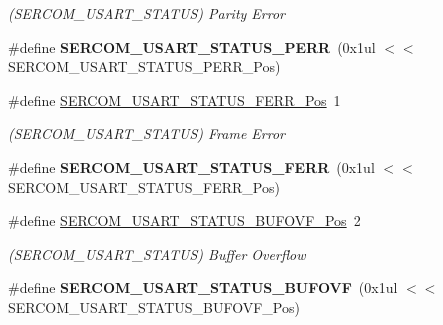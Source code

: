 \begin{DoxyCompactItemize}
\begin{DoxyCompactList}\small\item\em (S\+E\+R\+C\+O\+M\+\_\+\+U\+S\+A\+R\+T\+\_\+\+S\+T\+A\+T\+U\+S) Parity Error \end{DoxyCompactList}\item 
\hypertarget{group___s_a_m_l21___s_e_r_c_o_m_gae5dd4d066087b378990af1ae39991c5c}{}\#define {\bfseries S\+E\+R\+C\+O\+M\+\_\+\+U\+S\+A\+R\+T\+\_\+\+S\+T\+A\+T\+U\+S\+\_\+\+P\+E\+R\+R}~(0x1ul $<$$<$ S\+E\+R\+C\+O\+M\+\_\+\+U\+S\+A\+R\+T\+\_\+\+S\+T\+A\+T\+U\+S\+\_\+\+P\+E\+R\+R\+\_\+\+Pos)\label{group___s_a_m_l21___s_e_r_c_o_m_gae5dd4d066087b378990af1ae39991c5c}

\item 
\hypertarget{group___s_a_m_l21___s_e_r_c_o_m_ga3811cadeeefcecb6228b355ae43a7c43}{}\#define \hyperlink{group___s_a_m_l21___s_e_r_c_o_m_ga3811cadeeefcecb6228b355ae43a7c43}{S\+E\+R\+C\+O\+M\+\_\+\+U\+S\+A\+R\+T\+\_\+\+S\+T\+A\+T\+U\+S\+\_\+\+F\+E\+R\+R\+\_\+\+Pos}~1\label{group___s_a_m_l21___s_e_r_c_o_m_ga3811cadeeefcecb6228b355ae43a7c43}

\begin{DoxyCompactList}\small\item\em (S\+E\+R\+C\+O\+M\+\_\+\+U\+S\+A\+R\+T\+\_\+\+S\+T\+A\+T\+U\+S) Frame Error \end{DoxyCompactList}\item 
\hypertarget{group___s_a_m_l21___s_e_r_c_o_m_ga2e27ff41ea4b7a10bfb9393e0e500581}{}\#define {\bfseries S\+E\+R\+C\+O\+M\+\_\+\+U\+S\+A\+R\+T\+\_\+\+S\+T\+A\+T\+U\+S\+\_\+\+F\+E\+R\+R}~(0x1ul $<$$<$ S\+E\+R\+C\+O\+M\+\_\+\+U\+S\+A\+R\+T\+\_\+\+S\+T\+A\+T\+U\+S\+\_\+\+F\+E\+R\+R\+\_\+\+Pos)\label{group___s_a_m_l21___s_e_r_c_o_m_ga2e27ff41ea4b7a10bfb9393e0e500581}

\item 
\hypertarget{group___s_a_m_l21___s_e_r_c_o_m_gab1d434e6661579dfdd4bb5c4a240e0ff}{}\#define \hyperlink{group___s_a_m_l21___s_e_r_c_o_m_gab1d434e6661579dfdd4bb5c4a240e0ff}{S\+E\+R\+C\+O\+M\+\_\+\+U\+S\+A\+R\+T\+\_\+\+S\+T\+A\+T\+U\+S\+\_\+\+B\+U\+F\+O\+V\+F\+\_\+\+Pos}~2\label{group___s_a_m_l21___s_e_r_c_o_m_gab1d434e6661579dfdd4bb5c4a240e0ff}

\begin{DoxyCompactList}\small\item\em (S\+E\+R\+C\+O\+M\+\_\+\+U\+S\+A\+R\+T\+\_\+\+S\+T\+A\+T\+U\+S) Buffer Overflow \end{DoxyCompactList}\item 
\hypertarget{group___s_a_m_l21___s_e_r_c_o_m_gaed8c1f265d621562287ae015ee599258}{}\#define {\bfseries S\+E\+R\+C\+O\+M\+\_\+\+U\+S\+A\+R\+T\+\_\+\+S\+T\+A\+T\+U\+S\+\_\+\+B\+U\+F\+O\+V\+F}~(0x1ul $<$$<$ S\+E\+R\+C\+O\+M\+\_\+\+U\+S\+A\+R\+T\+\_\+\+S\+T\+A\+T\+U\+S\+\_\+\+B\+U\+F\+O\+V\+F\+\_\+\+Pos)\label{group___s_a_m_l21___s_e_r_c_o_m_gaed8c1f265d621562287ae015ee599258}


\end{DoxyCompactItemize}
